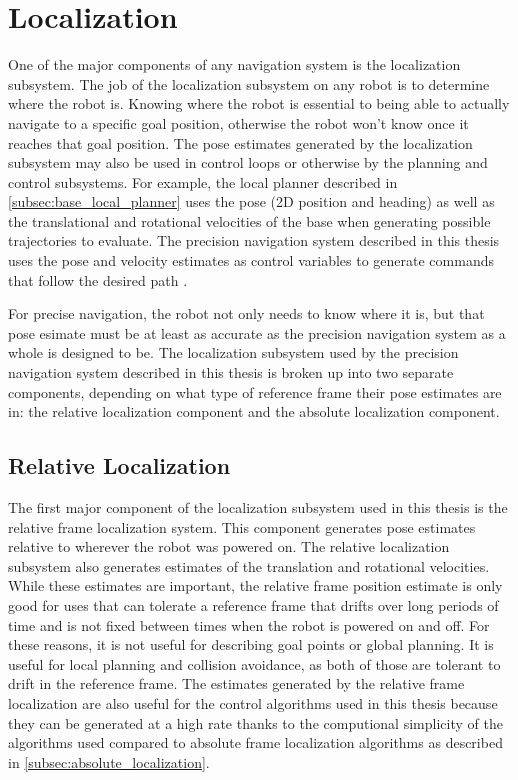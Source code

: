 \section{Localization}\label{sec:localization}

One of the major components of any navigation system is the localization subsystem. The job of the localization subsystem on any robot is to determine where the robot is. Knowing where the robot is essential to being able to actually navigate to a specific goal position, otherwise the robot won't know once it reaches that goal position. The pose estimates generated by the localization subsystem may also be used in control loops or otherwise by the planning and control subsystems. For example, the local planner described in \autoref{subsec:base_local_planner} uses the pose (2D position and heading) as well as the translational and rotational velocities of the base when generating possible trajectories to evaluate. The precision navigation system described in this thesis uses the pose and velocity estimates as control variables to generate commands that follow the desired path .

For precise navigation, the robot not only needs to know where it is, but that pose esimate must be at least as accurate as the precision navigation system as a whole is designed to be. The localization subsystem used by the precision navigation system described in this thesis is broken up into two separate components, depending on what type of reference frame their pose estimates are in: the relative localization component and the absolute localization component.

\subsection{Relative Localization}\label{subsec:relative_localization}

The first major component of the localization subsystem used in this thesis is the relative frame localization system. This component generates pose estimates relative to wherever the robot was powered on. The relative localization subsystem also generates estimates of the translation and rotational velocities. While these estimates are important, the relative frame position estimate is only good for uses that can tolerate a reference frame that drifts over long periods of time and is not fixed between times when the robot is powered on and off. For these reasons, it is not useful for describing goal points or global planning. It is useful for local planning and collision avoidance, as both of those are tolerant to drift in the reference frame. The estimates generated by the relative frame localization are also useful for the control algorithms used in this thesis because they can be generated at a high rate thanks to the computional simplicity of the algorithms used compared to absolute frame localization algorithms as described in \autoref{subsec:absolute_localization}.

